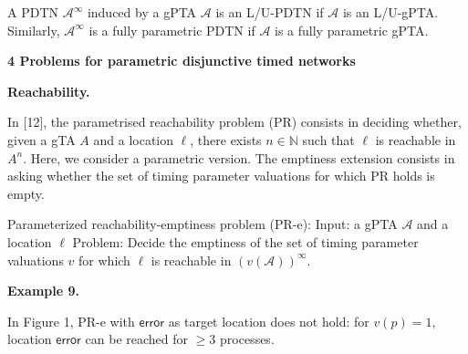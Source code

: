  
A PDTN ${\mathcal{A}}^{\infty}$ induced by a gPTA $\mathcal{A}$ is an L/U-PDTN if $\mathcal{A}$ is an L/U-gPTA. Similarly, ${\mathcal{A}}^{\infty}$ is a fully parametric PDTN if $\mathcal{A}$ is a fully parametric gPTA.\par
 
 
 


 
\par\medskip\noindent\textbf{4 Problems for parametric disjunctive timed networks}\par
 
 
\par\medskip\noindent\textbf{Reachability.}\par
 
 
In [12], the parametrised reachability problem (PR) consists in deciding whether, given a gTA ${A}$ and a location $\mathrm{\ell}$, there exists $n\in\mathbb{N}$ such that $\mathrm{\ell}$ is reachable in ${{A}}^{n}$. Here, we consider a parametric version. The emptiness extension consists in asking whether the set of timing parameter valuations for which PR holds is empty.\par
 
 
 
Parameterized reachability-emptiness problem (PR-e): Input: a gPTA $\mathcal{A}$ and a location $\mathrm{\ell}$ Problem: Decide the emptiness of the set of timing parameter valuations $v$ for which $\mathrm{\ell}$ is reachable in ${(v(\mathcal{A}))}^{\infty}$.\par
 
 
 
\par\medskip\noindent\textbf{Example 9.}\par
 
 
In Figure 1, PR-e with $\mathsf{error}$ as target location does not hold: for $v(p)=1$, location $\mathsf{error}$ can be reached for $\geq 3$ processes.\par
 
